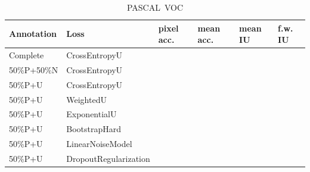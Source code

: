 \begin{table}
\begin{center}
\begin{tabular}{ll|llll}
Annotation  & Loss & pixel acc. & mean acc. & mean IU & f.w. IU \\
\hline
Complete    & CrossEntropyU    &  &  & & \\
50\%P+50\%N & CrossEntropyU    & & & & \\
50\%P+U     & CrossEntropyU    & & & & \\
50\%P+U     & WeightedU        &  &  & & \\
50\%P+U     & ExponentialU     &  &  & & \\
50\%P+U     & BootstrapHard    &  &  & & \\
50\%P+U     & LinearNoiseModel & & & & \\
50\%P+U     & DropoutRegularization & & & & \\
\end{tabular}
\end{center}
\caption{PASCAL\ VOC}
\end{table}
